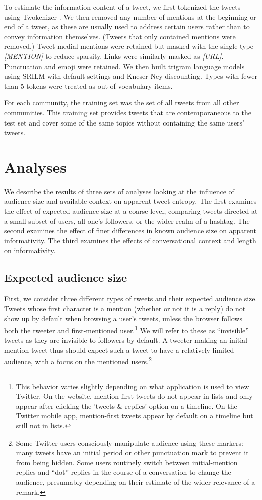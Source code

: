 \documentclass[11pt,letterpaper]{article}
\begin{document}
To estimate the information content of a tweet, we first tokenized the tweets using Twokenizer \cite{owoputi2013}. We then removed any number of mentions at the beginning or end of a tweet, as these are usually used to address certain users rather than to convey information themselves. (Tweets that only contained mentions were removed.)  Tweet-medial mentions were retained but masked with the single type {\it [MENTION]} to reduce sparsity. Links were similarly masked as {\it [URL]}. Punctuation and emoji were retained. We then built trigram language models using SRILM with default settings and Kneser-Ney discounting.  Types with fewer than 5 tokens were treated as out-of-vocabulary items. 

For each community, the training set was the set of all tweets from all other communities.  This training set provides tweets that are contemporaneous to the test set and cover some of the same topics without containing the same users' tweets.

\section{Analyses}

We describe the results of three sets of analyses looking at the influence of audience size and available context on apparent tweet entropy. The first examines the effect of expected audience size at a coarse level, comparing tweets directed at a small subset of users, all one's followers, or the wider realm of a hashtag.   The second examines the effect of finer differences in known audience size on apparent informativity.  The third examines the effects of conversational context and length on informativity.

\subsection{Expected audience size}
\label{sec:expected}

First, we consider three different types of tweets and their expected audience size.  Tweets whose first character is a mention (whether or not it is a reply) do not show up by default when browsing a user's tweets, unless the browser follows both the tweeter and first-mentioned user.\footnote{This behavior varies slightly depending on what application is used to view Twitter.  On the website, mention-first tweets do not appear in lists and only appear after clicking the 'tweets \& replies' option on a timeline. On the Twitter mobile app, mention-first tweets appear by default on a timeline but still not in lists.} We will refer to these as ``invisible'' tweets as they are invisible to followers by default.  A tweeter making an initial-mention tweet thus should expect such a tweet to have a relatively limited audience, with a focus on the mentioned users.\footnote{Some Twitter users consciously manipulate audience using these markers: many tweets have an initial period or other punctuation mark to prevent it from being hidden. Some users routinely switch between initial-mention replies and ``dot''-replies in the course of a conversation to change the audience, presumably depending on their estimate of the wider relevance of a remark.}
\end{document}
